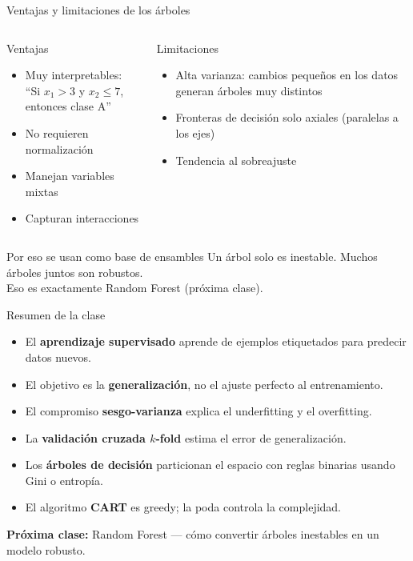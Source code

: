 \documentclass[aspectratio=169]{beamer}
\begin{document}
\begin{frame}{Ventajas y limitaciones de los árboles}
  \begin{columns}
    \begin{block}{Ventajas}
      \begin{itemize}
        \item Muy interpretables:\\``Si $x_1 > 3$ y $x_2 \leq 7$, entonces clase A''
        \item No requieren normalización
        \item Manejan variables mixtas
        \item Capturan interacciones
      \end{itemize}
    \end{block}

    \begin{alertblock}{Limitaciones}
      \begin{itemize}
        \item Alta varianza: cambios pequeños en los datos generan árboles muy distintos
        \item Fronteras de decisión solo axiales (paralelas a los ejes)
        \item Tendencia al sobreajuste
      \end{itemize}
    \end{alertblock}
  \end{columns}

  \medskip
  \begin{exampleblock}{Por eso se usan como base de ensambles}
    Un árbol solo es inestable. Muchos árboles juntos son robustos.\\
    Eso es exactamente Random Forest (próxima clase).
  \end{exampleblock}
\end{frame}

\begin{frame}{Resumen de la clase}
  \begin{itemize}
    \item El \textbf{aprendizaje supervisado} aprende de ejemplos etiquetados para predecir datos nuevos.
    \item El objetivo es la \textbf{generalización}, no el ajuste perfecto al entrenamiento.
    \item El compromiso \textbf{sesgo-varianza} explica el underfitting y el overfitting.
    \item La \textbf{validación cruzada $k$-fold} estima el error de generalización.
    \item Los \textbf{árboles de decisión} particionan el espacio con reglas binarias usando Gini o entropía.
    \item El algoritmo \textbf{CART} es greedy; la poda controla la complejidad.
  \end{itemize}

  \bigskip
  \textbf{Próxima clase:} Random Forest --- cómo convertir árboles inestables en un modelo robusto.
\end{frame}
\end{document}
